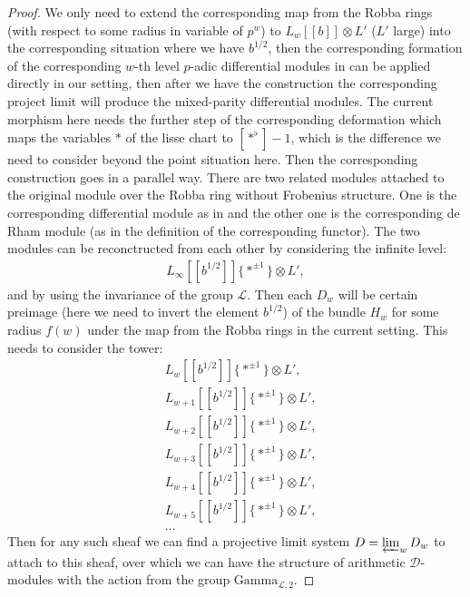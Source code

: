 \documentclass[12pt]{article}
\theoremstyle{definition}
\begin{document}
\begin{proof}
We only need to extend the corresponding map from the Robba rings (with respect to some radius in variable of $p^w$) to $L_w[[b]]\otimes L'$ ($L'$ large) into the corresponding situation where we have $b^{1/2}$, then the corresponding formation of the corresponding $w$-th level $p$-adic differential modules in \cite[See and follow the construction around 5.10, the Theorem]{1BA} can be applied directly in our setting, then after we have the construction the corresponding project limit will produce the mixed-parity differential modules. The current morphism here needs the further step of the corresponding deformation which maps the variables $*$ of the lisse chart to $[*^\flat]-1$, which is the difference we need to consider beyond the point situation here. Then the corresponding construction goes in a parallel way. There are two related modules attached to the original module over the Robba ring without Frobenius structure. One is the corresponding differential module as in \cite{1BA} and the other one is the corresponding de Rham module (as in the definition of the corresponding functor). The two modules can be reconctructed from each other by considering the infinite level:
\begin{align}
L_\infty[[b^{1/2}]]\{*^{\pm 1}\}\otimes L',
\end{align}
and by using the invariance of the group $\mathcal{L}$. Then each $D_w$ will be certain preimage (here we need to invert the element $b^{1/2}$) of the bundle $H_w$ for some radius $f(w)$ under the map from the Robba rings in the current setting. This needs to consider the tower:
\begin{align}
&L_w[[b^{1/2}]]\{*^{\pm 1}\}\otimes L',\\
&L_{w+1}[[b^{1/2}]]\{*^{\pm 1}\}\otimes L',\\
&L_{w+2}[[b^{1/2}]]\{*^{\pm 1}\}\otimes L',\\
&L_{w+3}[[b^{1/2}]]\{*^{\pm 1}\}\otimes L',\\
&L_{w+4}[[b^{1/2}]]\{*^{\pm 1}\}\otimes L',\\
&L_{w+5}[[b^{1/2}]]\{*^{\pm 1}\}\otimes L',\\
&...
\end{align}
Then for any such sheaf we can find a projective limit system $D=\varprojlim_w D_w$ to attach to this sheaf, over which we can have the structure of arithmetic $\mathcal{D}$-modules with the action from the group $\mathrm{Gamma}_{\mathcal{L},2}$. 
\end{proof}
\end{document}
